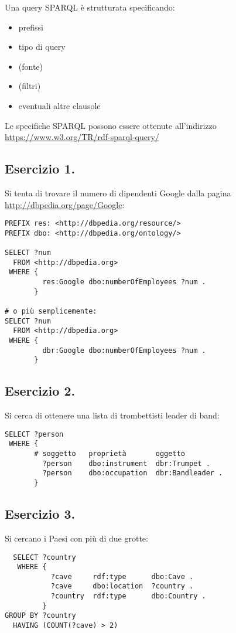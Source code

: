 \documentclass[11pt]{article}
\begin{document}
Una query SPARQL è strutturata specificando:
\begin{itemize}
  \item prefissi
  \item tipo di query
  \item (fonte)
  \item (filtri)
  \item eventuali altre clausole
\end{itemize}
Le specifiche SPARQL possono essere ottenute all'indirizzo \url{https://www.w3.org/TR/rdf-sparql-query/}

\subsection*{Esercizio 1.}
Si tenta di trovare il numero di dipendenti Google dalla pagina \url{http://dbpedia.org/page/Google}:
\begin{verbatim}
PREFIX res: <http://dbpedia.org/resource/>
PREFIX dbo: <http://dbpedia.org/ontology/>

SELECT ?num
  FROM <http://dbpedia.org>
 WHERE {
         res:Google dbo:numberOfEmployees ?num .
       }

# o più semplicemente:
SELECT ?num
  FROM <http://dbpedia.org>
 WHERE {
         dbr:Google dbo:numberOfEmployees ?num .
       }
\end{verbatim}

\subsection*{Esercizio 2.}
Si cerca di ottenere una lista di trombettisti leader di band:
\begin{verbatim}
SELECT ?person
 WHERE {
       # soggetto   proprietà       oggetto
         ?person    dbo:instrument  dbr:Trumpet .
         ?person    dbo:occupation  dbr:Bandleader .
       }
\end{verbatim}

\subsection*{Esercizio 3.}
Si cercano i Paesi con più di due grotte:
\begin{verbatim}
  SELECT ?country
   WHERE {
           ?cave     rdf:type      dbo:Cave .
           ?cave     dbo:location  ?country .
           ?country  rdf:type      dbo:Country .
         }
GROUP BY ?country
  HAVING (COUNT(?cave) > 2)
\end{verbatim}
\end{document}
